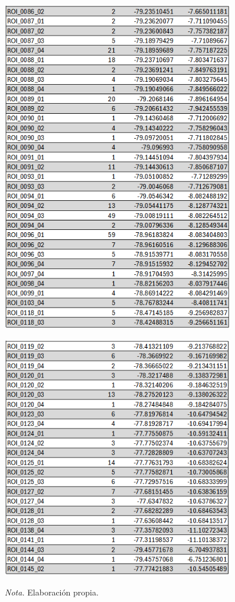 \begin{figure}[H]
    \centering
    \includegraphics[width=0.9\textwidth]{img/8_capitulo6/ROI_2.png}
    \label{fig:figura_2}
\end{figure}
\begin{figure}[H]
    \centering
    \includegraphics[width=0.9\textwidth]{img/8_capitulo6/ROI_3.png}
    \label{fig:figura_3}
    \begin{flushleft}
        \textit{Nota.} Elaboración propia.        
        \vspace{-\baselineskip}
    \end{flushleft}
\end{figure}